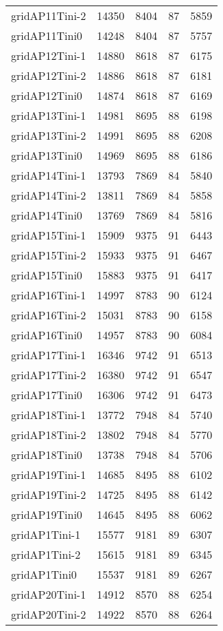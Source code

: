 \documentclass[../../../thesis.tex]{subfiles}
\begin{document}
\begin{longtable}{lrrrr}
gridAP11Tini-2 & 14350 & 8404 & 87 & 5859 \\
gridAP11Tini0 & 14248 & 8404 & 87 & 5757 \\
gridAP12Tini-1 & 14880 & 8618 & 87 & 6175 \\
gridAP12Tini-2 & 14886 & 8618 & 87 & 6181 \\
gridAP12Tini0 & 14874 & 8618 & 87 & 6169 \\
gridAP13Tini-1 & 14981 & 8695 & 88 & 6198 \\
gridAP13Tini-2 & 14991 & 8695 & 88 & 6208 \\
gridAP13Tini0 & 14969 & 8695 & 88 & 6186 \\
gridAP14Tini-1 & 13793 & 7869 & 84 & 5840 \\
gridAP14Tini-2 & 13811 & 7869 & 84 & 5858 \\
gridAP14Tini0 & 13769 & 7869 & 84 & 5816 \\
gridAP15Tini-1 & 15909 & 9375 & 91 & 6443 \\
gridAP15Tini-2 & 15933 & 9375 & 91 & 6467 \\
gridAP15Tini0 & 15883 & 9375 & 91 & 6417 \\
gridAP16Tini-1 & 14997 & 8783 & 90 & 6124 \\
gridAP16Tini-2 & 15031 & 8783 & 90 & 6158 \\
gridAP16Tini0 & 14957 & 8783 & 90 & 6084 \\
gridAP17Tini-1 & 16346 & 9742 & 91 & 6513 \\
gridAP17Tini-2 & 16380 & 9742 & 91 & 6547 \\
gridAP17Tini0 & 16306 & 9742 & 91 & 6473 \\
gridAP18Tini-1 & 13772 & 7948 & 84 & 5740 \\
gridAP18Tini-2 & 13802 & 7948 & 84 & 5770 \\
gridAP18Tini0 & 13738 & 7948 & 84 & 5706 \\
gridAP19Tini-1 & 14685 & 8495 & 88 & 6102 \\
gridAP19Tini-2 & 14725 & 8495 & 88 & 6142 \\
gridAP19Tini0 & 14645 & 8495 & 88 & 6062 \\
gridAP1Tini-1 & 15577 & 9181 & 89 & 6307 \\
gridAP1Tini-2 & 15615 & 9181 & 89 & 6345 \\
gridAP1Tini0 & 15537 & 9181 & 89 & 6267 \\
gridAP20Tini-1 & 14912 & 8570 & 88 & 6254 \\
gridAP20Tini-2 & 14922 & 8570 & 88 & 6264 \\

\end{longtable}
\end{document}

